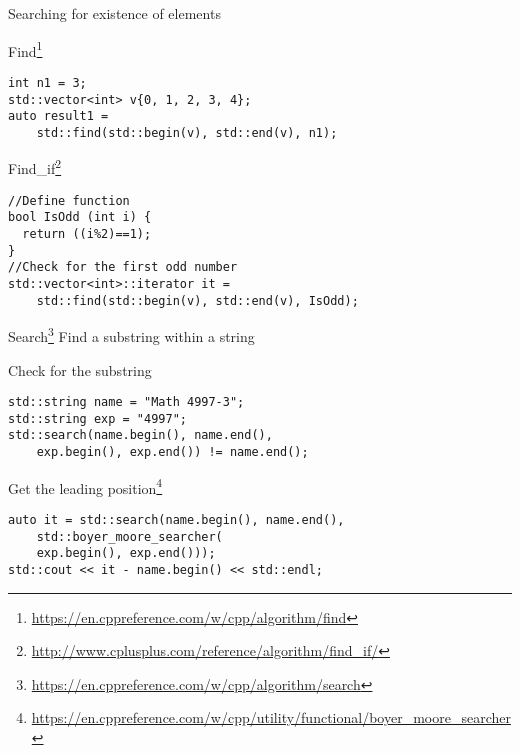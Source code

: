 \documentclass[12pt,t]{beamer}
\begin{document}
\begin{frame}[fragile]{Searching for existence of elements}
\begin{block}{Find\footnote{\tiny\url{https://en.cppreference.com/w/cpp/algorithm/find}}}
\begin{lstlisting}
int n1 = 3;
std::vector<int> v{0, 1, 2, 3, 4}; 
auto result1 = 
	std::find(std::begin(v), std::end(v), n1);
\end{lstlisting}
\end{block}

\begin{block}{Find\_if\footnote{\tiny\url{http://www.cplusplus.com/reference/algorithm/find_if/}}}
\begin{lstlisting}
//Define function
bool IsOdd (int i) {
  return ((i%2)==1);
}
//Check for the first odd number
std::vector<int>::iterator it = 
	std::find(std::begin(v), std::end(v), IsOdd);
\end{lstlisting}
\end{block}

\end{frame}


\begin{frame}[fragile]{Search\footnote{\tiny\url{https://en.cppreference.com/w/cpp/algorithm/search}}}
Find a substring within a string

\begin{block}{Check for the substring }
\begin{lstlisting}
std::string name = "Math 4997-3";
std::string exp = "4997";
std::search(name.begin(), name.end(), 
	exp.begin(), exp.end()) != name.end();
\end{lstlisting}
\end{block}

\begin{block}{Get the leading position\footnote{\tiny\url{https://en.cppreference.com/w/cpp/utility/functional/boyer_moore_searcher}}}
\begin{lstlisting}
auto it = std::search(name.begin(), name.end(),
	std::boyer_moore_searcher(
	exp.begin(), exp.end()));
std::cout << it - name.begin() << std::endl;
\end{lstlisting}
\end{block}

\end{frame}
\end{document}
